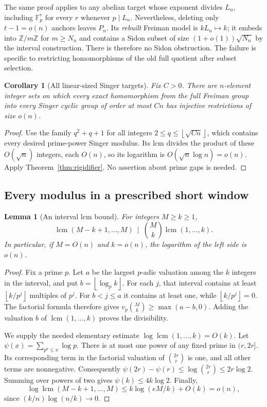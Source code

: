 \documentclass[11pt]{article}
\newtheorem{lemma}[theorem]{Lemma}
\newtheorem{corollary}[theorem]{Corollary}
\theoremstyle{definition}
\theoremstyle{remark}
\newcommand{\Z}{\mathbb Z}
\newcommand{\F}{\mathbb F}
\newcommand{\floor}[1]{\left\lfloor #1\right\rfloor}
\begin{document}
The same proof applies to any abelian target whose exponent divides
$L_n$, including $\F_p^r$ for every $r$ whenever $p\mid L_n$.
Nevertheless, deleting only $t-1=o(n)$ anchors leaves $P_n$.
Its \emph{rebuilt} Freiman model is $kL_n\mapsto k$; it embeds into
$\Z/m\Z$ for $m\ge N_n$ and contains a Sidon subset of size
$(1+o(1))\sqrt{N_n}$ by the interval construction.
There is therefore no Sidon obstruction. The failure is specific to
restricting homomorphisms of the old full quotient after subset selection.

\begin{corollary}[All linear-sized Singer targets]\label{cor:singer-rigidifier}
Fix $C>0$. There are $n$-element integer sets on which every exact
homomorphism from the full Freiman group into every Singer cyclic group
of order at most $Cn$ has injective restrictions of size $o(n)$.
\end{corollary}
\begin{proof}
Use the family $q^2+q+1$ for all integers
$2\le q\le\floor{\sqrt{Cn}}$, which contains every desired prime-power
Singer modulus. Its lcm divides the product of these
$O(\sqrt n)$ integers, each $O(n)$, so its logarithm is
$O(\sqrt n\log n)=o(n)$. Apply Theorem~\ref{thm:rigidifier}.
No assertion about prime gaps is needed.
\end{proof}

\subsection{Every modulus in a prescribed short window}

\begin{lemma}[An interval lcm bound]\label{lem:interval-lcm}
For integers $M\ge k\ge1$,
\[
\operatorname{lcm}(M-k+1,\ldots,M)
\ \mid\ \binom Mk\operatorname{lcm}(1,\ldots,k).
\]
In particular, if $M=O(n)$ and $k=o(n)$, the logarithm of the left
side is $o(n)$.
\end{lemma}
\begin{proof}
Fix a prime $p$. Let $a$ be the largest $p$-adic valuation among the
$k$ integers in the interval, and put $b=\floor{\log_p k}$.
For each $j$, that interval contains at least $\floor{k/p^j}$ multiples
of $p^j$. For $b<j\le a$ it contains at least one, while
$\floor{k/p^j}=0$. The factorial formula therefore gives
$v_p\binom Mk\ge\max(a-b,0)$. Adding the valuation $b$ of
$\operatorname{lcm}(1,\ldots,k)$ proves the divisibility.

We supply the needed elementary estimate
$\log\operatorname{lcm}(1,\ldots,k)=O(k)$.
Let $\psi(x)=\sum_{p^a\le x}\log p$. There is at most one power of
any fixed prime in $(r,2r]$. Its corresponding term in the factorial
valuation of $\binom{2r}r$ is one, and all other terms are nonnegative.
Consequently
$\psi(2r)-\psi(r)\le\log\binom{2r}r\le2r\log2$.
Summing over powers of two gives $\psi(k)\le4k\log2$.
Finally,
\[
\log\operatorname{lcm}(M-k+1,\ldots,M)
\le k\log(eM/k)+O(k)=o(n),
\]
since $(k/n)\log(n/k)\to0$.
\end{proof}
\end{document}
